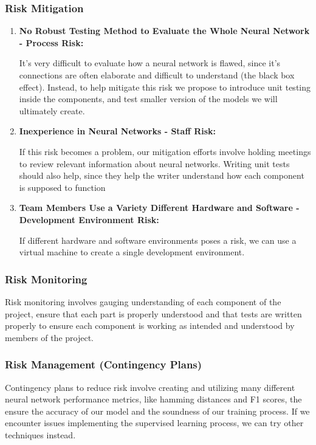 \documentclass[english,12pt]{article}
\begin{document}
\subsubsection{Risk Mitigation}
\begin{enumerate}[1.]
  \item \textbf{No Robust Testing Method to Evaluate the Whole Neural Network - Process Risk:}

  It's very difficult to evaluate how a neural network is flawed, since it's connections
  are often elaborate and difficult to understand (the black box effect). Instead, to help mitigate this risk we propose to introduce unit testing inside the components, and test smaller version
  of the models we will ultimately create.

  \item \textbf{Inexperience in Neural Networks - Staff Risk:}

  If this risk becomes a problem, our mitigation efforts involve
  holding meetings to review relevant information about neural networks. 
  Writing unit tests should also help, since they help the writer understand
  how each component is supposed to function

  \item \textbf{Team Members Use a Variety Different Hardware and Software 
  - Development Environment Risk:}
  
 If different hardware and software environments poses a risk, we can use a virtual machine
 to create a single development environment.
 
\end{enumerate}
\subsubsection{Risk Monitoring}
Risk monitoring involves gauging understanding of each component of the project, ensure
that each part is properly understood and that tests are written properly to ensure each component
is working as intended and understood by members of the project.

\subsubsection{Risk Management (Contingency Plans)}
Contingency plans to reduce risk involve creating and utilizing many different
neural network performance metrics, like hamming distances and F1 scores, the ensure
the accuracy of our model and the soundness of our training process. If we encounter
issues implementing the supervised learning process, we can try other techniques instead.
\end{document}

